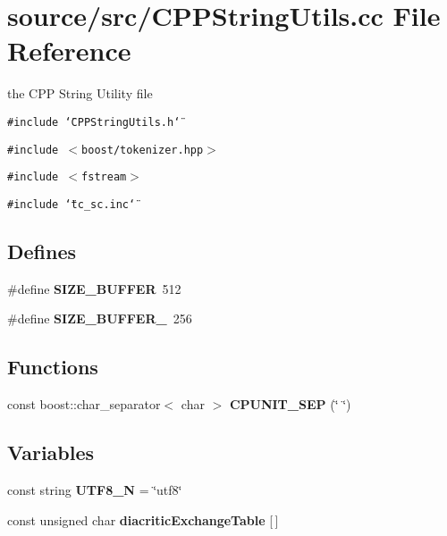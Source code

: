 \section{source/src/CPPStringUtils.cc File Reference}
\label{CPPStringUtils_8cc}
the CPP String Utility file 

{\tt \#include \char`\"{}CPPStringUtils.h\char`\"{}}\par
{\tt \#include $<$boost/tokenizer.hpp$>$}\par
{\tt \#include $<$fstream$>$}\par
{\tt \#include \char`\"{}tc\_\-sc.inc\char`\"{}}\par
\subsection*{Defines}
\begin{CompactItemize}
\item 
\#define \textbf{SIZE\_\-BUFFER}~512\label{CPPStringUtils_8cc_4dea39042071768c1e115b0ebbfc52f2}

\item 
\#define \textbf{SIZE\_\-BUFFER\_}~256\label{CPPStringUtils_8cc_a4577a3eb0be47804f1ec7e20554d163}

\end{CompactItemize}
\subsection*{Functions}
\begin{CompactItemize}
\item 
const boost::char\_\-separator$<$ char $>$ \textbf{CPUNIT\_\-SEP} (\char`\"{} \char`\"{})\label{CPPStringUtils_8cc_704b52ee55bfc9528ac9a84441848f09}

\end{CompactItemize}
\subsection*{Variables}
\begin{CompactItemize}
\item 
const string \textbf{UTF8\_\-N} = \char`\"{}utf8\char`\"{}\label{CPPStringUtils_8cc_4b94e31764062d505344847ad696ac2c}

\item 
const unsigned char \textbf{diacriticExchangeTable} [$\,$]
\end{CompactItemize}


